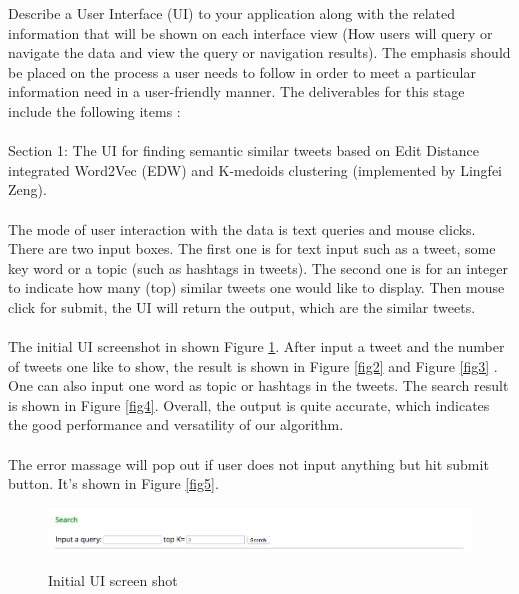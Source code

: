 \documentclass[10pt]{article}
\begin{document}
\textnormal{
Describe a User Interface (UI) to your application along with the related information that will be shown on each interface view (How users will query or navigate the data and view the query or navigation results). The emphasis should be placed on the process a user needs to follow in order to meet a particular information need in a user-friendly manner.
The deliverables for this stage include the following items :\\\\
Section 1: The UI for finding semantic similar tweets based on Edit Distance integrated Word2Vec (EDW) and K-medoids clustering (implemented by Lingfei Zeng).\\\\
The mode of user interaction with the data is text queries and mouse clicks. There are two input boxes. The first one is for text input such as a tweet, some key word or a topic (such as hashtags in tweets). The second one is for an integer to indicate how many (top) similar tweets one would like to display. Then mouse click for submit, the UI will return the output, which are the similar tweets. \\\\
The initial UI screenshot in shown Figure \ref{fig1}. After input a tweet and the number of tweets one like to show, the result is shown in Figure \ref{fig2} and Figure \ref{fig3} . One can also input one word as topic or hashtags in the tweets. The search result is shown in  Figure \ref{fig4}. Overall, the output is quite accurate, which indicates the good performance and versatility of our algorithm. \\\\
The error massage will pop out if user does not input anything but hit submit button. It's shown in Figure \ref{fig5}.   
}

 
\begin{figure}[h]
	\caption{Initial UI screen shot}
	\centering
	\includegraphics[scale=0.3]{Screen_Shot_1.png}
	\label{fig1}
\end{figure}
\end{document}
